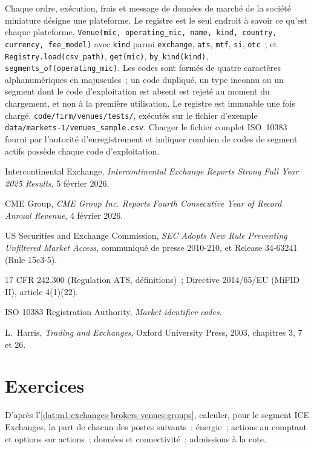 \begin{build}
 Chaque ordre, exécution, frais et message de données de marché de la
société miniature désigne une plateforme. Le registre est le seul endroit à savoir
ce qu'est chaque plateforme.  \texttt{Venue(mic, operating\_mic, name, kind, country,
currency, fee\_model)} avec \texttt{kind} parmi \texttt{exchange}, \texttt{ats},
\texttt{mtf}, \texttt{si}, \texttt{otc}~; et
\texttt{Registry.load(csv\_path)}, \texttt{get(mic)},
\texttt{by\_kind(kind)}, \texttt{segments\_of(operating\_mic)}.
 Les codes sont formés de quatre caractères alphanumériques en majuscules~; un code dupliqué, un
type inconnu ou un segment dont le code d'exploitation est absent est rejeté au moment du
chargement, et non à la première utilisation. Le registre est immuable une fois chargé.
 \texttt{code/firm/venues/tests/}, exécutés sur le
fichier d'exemple \texttt{data/markets-1/venues\_sample.csv}.
 Charger le fichier complet ISO~10383 fourni par
l'autorité d'enregistrement et indiquer combien de codes de segment actifs possède chaque code d'exploitation.
\end{build}

\begin{omsources}
\item Intercontinental Exchange, \emph{Intercontinental Exchange Reports
Strong Full Year 2025 Results}, 5 février 2026.
\item CME Group, \emph{CME Group Inc. Reports Fourth Consecutive Year of
Record Annual Revenue}, 4 février 2026.
\item US Securities and Exchange Commission, \emph{SEC Adopts New Rule
Preventing Unfiltered Market Access}, communiqué de presse 2010-210, et Release
34-63241 (Rule 15c3-5).
\item 17 CFR 242.300 (Regulation ATS, définitions)~; Directive 2014/65/EU
(MiFID II), article 4(1)(22).
\item ISO 10383 Registration Authority, \emph{Market identifier codes}.
\item L.~Harris, \emph{Trading and Exchanges}, Oxford University Press, 2003,
chapitres 3, 7 et 26.
\end{omsources}

\section{Exercices}

\begin{exercise}[$\star$]\label{exo:m1:exchanges-brokers-venues:1}
D'après l'\cref{dat:m1:exchanges-brokers-venues:groups}, calculer, pour le segment ICE
Exchanges, la part de chacun des postes suivants~: énergie~; actions au comptant et options sur actions~;
données et connectivité~; admissions à la cote.
\end{exercise}

